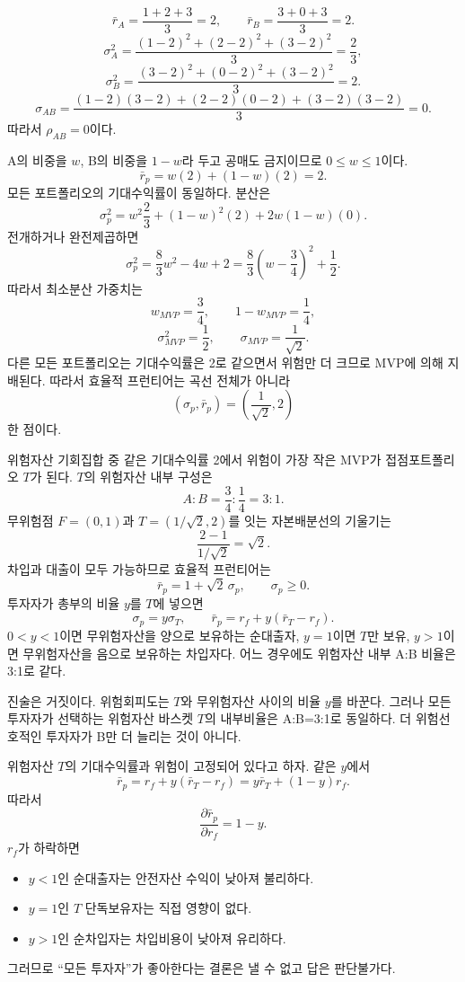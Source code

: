 \begin{solutionbox}
\[
\bar r_A=\frac{1+2+3}{3}=2,
\qquad
\bar r_B=\frac{3+0+3}{3}=2.
\]
\[
\sigma_A^2=\frac{(1-2)^2+(2-2)^2+(3-2)^2}{3}=\frac23,
\]
\[
\sigma_B^2=\frac{(3-2)^2+(0-2)^2+(3-2)^2}{3}=2.
\]
\[
\sigma_{AB}=\frac{(1-2)(3-2)+(2-2)(0-2)+(3-2)(3-2)}3=0.
\]
따라서 $\rho_{AB}=0$이다.

A의 비중을 $w$, B의 비중을 $1-w$라 두고 공매도 금지이므로 $0\le w\le1$이다.
\[
\bar r_p=w(2)+(1-w)(2)=2.
\]
모든 포트폴리오의 기대수익률이 동일하다. 분산은
\[
\sigma_p^2=w^2\frac23+(1-w)^2(2)+2w(1-w)(0).
\]
전개하거나 완전제곱하면
\[
\sigma_p^2=\frac83w^2-4w+2
=\frac83\left(w-\frac34\right)^2+\frac12.
\]
따라서 최소분산 가중치는
\[
w_{MVP}=\frac34,\qquad1-w_{MVP}=\frac14,
\]
\[
\sigma_{MVP}^2=\frac12,\qquad \sigma_{MVP}=\frac1{\sqrt2}.
\]
다른 모든 포트폴리오는 기대수익률은 2로 같으면서 위험만 더 크므로 MVP에 의해 지배된다. 따라서 효율적 프런티어는 곡선 전체가 아니라
\[
\boxed{\left(\sigma_p,\bar r_p\right)=\left(\frac1{\sqrt2},2\right)}
\]
한 점이다.

위험자산 기회집합 중 같은 기대수익률 2에서 위험이 가장 작은 MVP가 접점포트폴리오 $T$가 된다. $T$의 위험자산 내부 구성은
\[
A:B=\frac34:\frac14=3:1.
\]
무위험점 $F=(0,1)$과 $T=(1/\sqrt2,2)$를 잇는 자본배분선의 기울기는
\[
\frac{2-1}{1/\sqrt2}=\sqrt2.
\]
차입과 대출이 모두 가능하므로 효율적 프런티어는
\[
\boxed{\bar r_p=1+\sqrt2\,\sigma_p,\qquad\sigma_p\ge0}.
\]
투자자가 총부의 비율 $y$를 $T$에 넣으면
\[
\sigma_p=y\sigma_T,\qquad \bar r_p=r_f+y(\bar r_T-r_f).
\]
$0<y<1$이면 무위험자산을 양으로 보유하는 순대출자, $y=1$이면 $T$만 보유, $y>1$이면 무위험자산을 음으로 보유하는 차입자다. 어느 경우에도 위험자산 내부 A:B 비율은 3:1로 같다.

진술은 거짓이다. 위험회피도는 $T$와 무위험자산 사이의 비율 $y$를 바꾼다. 그러나 모든 투자자가 선택하는 위험자산 바스켓 $T$의 내부비율은 A:B=3:1로 동일하다. 더 위험선호적인 투자자가 B만 더 늘리는 것이 아니다.

위험자산 $T$의 기대수익률과 위험이 고정되어 있다고 하자. 같은 $y$에서
\[
\bar r_p=r_f+y(\bar r_T-r_f)
=y\bar r_T+(1-y)r_f.
\]
따라서
\[
\frac{\partial\bar r_p}{\partial r_f}=1-y.
\]
$r_f$가 하락하면
\begin{itemize}
\item $y<1$인 순대출자는 안전자산 수익이 낮아져 불리하다.
\item $y=1$인 $T$ 단독보유자는 직접 영향이 없다.
\item $y>1$인 순차입자는 차입비용이 낮아져 유리하다.
\end{itemize}
그러므로 ``모든 투자자''가 좋아한다는 결론은 낼 수 없고 답은 판단불가다.
\end{solutionbox}

